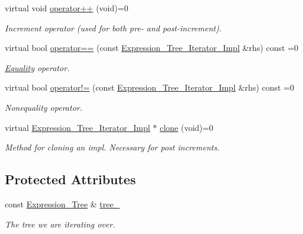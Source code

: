 \begin{DoxyCompactItemize}
virtual void \hyperlink{classMadara_1_1Expression__Tree_1_1Expression__Tree__Iterator__Impl_ae73d9d30eb08bb414115302cf6748205}{operator++} (void)=0
\begin{DoxyCompactList}\small\item\em Increment operator (used for both pre-\/ and post-\/increment). \item\end{DoxyCompactList}\item 
virtual bool \hyperlink{classMadara_1_1Expression__Tree_1_1Expression__Tree__Iterator__Impl_a05aaa44a9c047b7863789792d8d7830a}{operator==} (const \hyperlink{classMadara_1_1Expression__Tree_1_1Expression__Tree__Iterator__Impl}{Expression\_\-Tree\_\-Iterator\_\-Impl} \&rhs) const =0
\begin{DoxyCompactList}\small\item\em \hyperlink{classMadara_1_1Expression__Tree_1_1Equality}{Equality} operator. \item\end{DoxyCompactList}\item 
virtual bool \hyperlink{classMadara_1_1Expression__Tree_1_1Expression__Tree__Iterator__Impl_a82c7271bdc27fb7c98fcb2a656e22fb6}{operator!=} (const \hyperlink{classMadara_1_1Expression__Tree_1_1Expression__Tree__Iterator__Impl}{Expression\_\-Tree\_\-Iterator\_\-Impl} \&rhs) const =0
\begin{DoxyCompactList}\small\item\em Nonequality operator. \item\end{DoxyCompactList}\item 
virtual \hyperlink{classMadara_1_1Expression__Tree_1_1Expression__Tree__Iterator__Impl}{Expression\_\-Tree\_\-Iterator\_\-Impl} $\ast$ \hyperlink{classMadara_1_1Expression__Tree_1_1Expression__Tree__Iterator__Impl_add85852d0a6805269caa3290000c318d}{clone} (void)=0
\begin{DoxyCompactList}\small\item\em Method for cloning an impl. Necessary for post increments. \item\end{DoxyCompactList}\end{DoxyCompactItemize}
\subsection*{Protected Attributes}
\begin{DoxyCompactItemize}
\item 
const \hyperlink{classMadara_1_1Expression__Tree_1_1Expression__Tree}{Expression\_\-Tree} \& \hyperlink{classMadara_1_1Expression__Tree_1_1Expression__Tree__Iterator__Impl_a4b369e3fcfc62405321ece1d46719f93}{tree\_\-}
\begin{DoxyCompactList}\small\item\em The tree we are iterating over. \item\end{DoxyCompactList}\end{DoxyCompactItemize}
